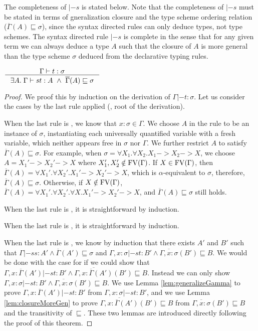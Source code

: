 The completeness of $|-s$ is stated below.
Note that the completeness of $|-s$ must be stated in terms of gneralization closure and
the type scheme ordering relation ($\overline{\Gamma}(A)\sqsubseteq\sigma$),
since the syntax directed rules can only deduce types, not type schemes.
The syntax directed rule $|-s$ is complete in the sense that for any given term
we can always deduce a type $A$ such that the closure of $A$ is more general
than the type scheme $\sigma$ deduced from the declarative typing rules.
\begin{theorem}
$ \inference
	{\Gamma |- t : \sigma}
	{\exists A.\;\Gamma |-s t : A ~\land~ \overline{\Gamma}(A)\sqsubseteq\sigma} $
\label{thm:sdHMcomplete}
\end{theorem}
\begin{proof}
We proof this by induction on the derivation of $\Gamma |- t : \sigma$.
Let us consider the cases by the last rule applied (\ie, root of the derivation).

When the last rule is , we know that $x:\sigma \in \Gamma$.
We choose $A$ in the  rule to be an instance of $\sigma$,
instantiating each universally quantified variable with a fresh variable,
which neither appears free in $\sigma$ nor $\Gamma$. We further 
restrict $A$ to satisfy $\overline{\Gamma}(A)\sqsubseteq\sigma$.
For example, when $\sigma=\forall X_1.\forall X_2.X_1 -> X_2 -> X$,
we choose $A = X_1' -> X_2' -> X$ where $X_1',X_2'\notin\mathop{\mathrm{FV}}(\Gamma)$.
If $X\in\mathop{\mathrm{FV}}(\Gamma)$, then
$\overline{\Gamma}(A) = \forall X_1'.\forall X_2'.X_1' -> X_2' -> X$,
which is $\alpha$-equivalent to $\sigma$, therefore,
$\overline{\Gamma}(A)\sqsubseteq\sigma$.
Otherwise, if $X\notin\mathop{\mathrm{FV}}(\Gamma)$,
$\overline{\Gamma}(A) = \forall X_1'.\forall X_2'.\forall X.X_1' -> X_2' -> X$,
and $\overline{\Gamma}(A)\sqsubseteq\sigma$ still holds.

When the last rule is , it is straightforward by induction.

When the last rule is , it is straightforward by induction.

When the last rule is , we know by induction that there exists
$A'$ and $B'$ such that
$\Gamma |-s s : A' \land \overline{\Gamma}(A') \sqsubseteq \sigma$ and
$\Gamma,x:\sigma |-s t : B' \land
	\overline{\Gamma,x:\sigma}(B') \sqsubseteq B$.
We would be done with the case for  if we could show that
$\Gamma,x:\overline{\Gamma}(A') |-s t : B' \land
	\overline{\Gamma,x:\overline{\Gamma}(A')}(B') \sqsubseteq B$.
Instead we can only show $\Gamma,x:\sigma |-s t : B' \land
	\overline{\Gamma,x:\sigma}(B') \sqsubseteq B$.
We use Lemma \ref{lem:generalizeGamma} to prove
$\Gamma,x:\overline{\Gamma}(A') |-s t : B'$ from $\Gamma,x:\sigma |-s t : B'$,
and we use Lemma \ref{lem:closureMoreGen} to prove
$\overline{\Gamma,x:\overline{\Gamma}(A')}(B') \sqsubseteq B$
from $\overline{\Gamma,x:\sigma}(B') \sqsubseteq B$ and the transitivity of
$\sqsubseteq$. These two lemmas are introduced directly following the proof of this theorem.


\end{proof}
